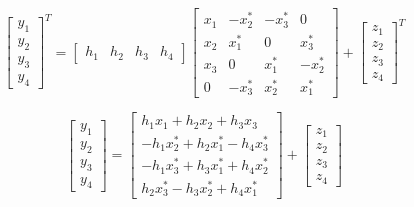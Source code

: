 \documentclass[fleqn]{article}
\begin{document}
\begin{enumerate}
\begin{enumerate}
			\begin{equation*}
				\begin{bmatrix}
					y_1 \\ y_2 \\ y_3 \\ y_4
				\end{bmatrix}^T = \begin{bmatrix}
					h_1 & h_2 & h_3 & h_4
				\end{bmatrix}\begin{bmatrix}
					x_1 & -x_2^* & -x_3^* &  0 \\ 
					x_2 &  x_1^* &  0     &  x_3^* \\
					x_3 &  0     &  x_1^* & -x_2^* \\
					0   & -x_3^* &  x_2^* &  x_1^*
				\end{bmatrix} + \begin{bmatrix}
					z_1 \\ z_2 \\ z_3 \\ z_4
				\end{bmatrix}^T
			\end{equation*}
			
			\begin{equation*}
				\begin{bmatrix}
					y_1 \\ y_2 \\ y_3 \\ y_4
				\end{bmatrix} = \begin{bmatrix}
					 h_1x_1   + h_2x_2   + h_3x_3 \\
					-h_1x_2^* + h_2x_1^* - h_4x_3^* \\
					-h_1x_3^* + h_3x_1^* + h_4x_2^* \\
					 h_2x_3^* - h_3x_2^* + h_4x_1^*
				\end{bmatrix} + \begin{bmatrix}
					z_1 \\ z_2 \\ z_3 \\ z_4
				\end{bmatrix}
			\end{equation*}
			

\end{enumerate}
\end{enumerate}
\end{document}
